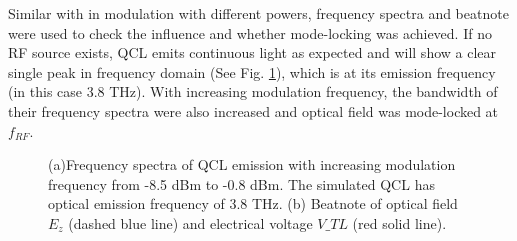 \documentclass[11pt,final]{scrbook}
\begin{document}
Similar with in modulation with different powers, frequency spectra and beatnote were used to check the influence and whether mode-locking was achieved. If no RF source exists, QCL emits continuous light as expected and will show a clear single peak in frequency domain (See Fig. \ref{fig:modA_Beatnote}), which is at its emission frequency (in this case 3.8 THz). With increasing modulation frequency, the bandwidth of their frequency spectra were also increased and optical field was mode-locked at $f_{RF}$.
\begin{figure}[htbp]
  \centering
\caption{(a)Frequency spectra of QCL emission with increasing modulation frequency from -8.5 dBm to -0.8 dBm. The simulated QCL has optical emission frequency of 3.8 THz. (b) Beatnote of optical field $E_{z}$ (dashed blue line) and electrical voltage $V\_{TL}$ (red solid line).}
\label{fig:modA_Beatnote}
\end{figure}
\end{document}
